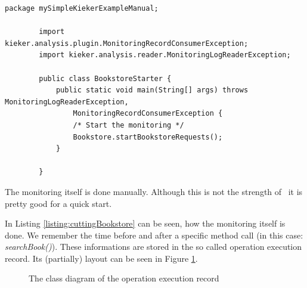       

	  \begin{lstlisting}[caption=BookstoreStarter.java]
		package mySimpleKiekerExampleManual;

		import kieker.analysis.plugin.MonitoringRecordConsumerException;
		import kieker.analysis.reader.MonitoringLogReaderException;

		public class BookstoreStarter {
			public static void main(String[] args) throws MonitoringLogReaderException,
				MonitoringRecordConsumerException {
				/* Start the monitoring */
				Bookstore.startBookstoreRequests();
			}

		}
	  \end{lstlisting}
	  
      

      
	  
      The monitoring itself is done manually. Although this is not the strength of \Kieker\ it is pretty good for a quick start.
	  
      
	  
      In Listing \ref{listing:cuttingBookstore} can be seen, how the monitoring itself is done. We remember the time before and after a specific method call (in this case: \textit{searchBook()}). These informations are stored in the so called operation execution record. Its (partially) layout can be seen in Figure \ref{image:operationexecutionrecordclassdiagram}.
	  
		\begin{figure}[H]
			\begin{center}
				\caption{The class diagram of the operation execution record}
				\label{image:operationexecutionrecordclassdiagram}
			\end{center}
		\end{figure}
	  
